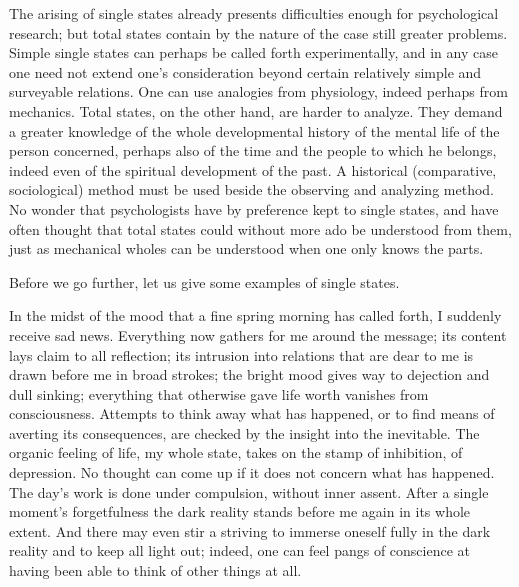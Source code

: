 \documentclass[12pt]{book}
\newcommand{\opage}[1]{\marginnote{\footnotesize\textit{[#1]}}}
\begin{document}
The arising of single states already presents difficulties enough for
psychological research; but total states contain by the nature of the case
still greater problems. Simple single states can perhaps be called forth
experimentally, and in any case one need not extend one's consideration beyond
certain relatively simple and surveyable relations. One can use analogies from
physiology, indeed perhaps from mechanics. Total states, on the other hand, are
harder to analyze. They demand a greater knowledge of the whole developmental
history of the mental life of the person concerned, perhaps also of the time
and the people to which he belongs, indeed even of the spiritual development of
the past. A historical (comparative, sociological) method must be used beside
the observing and analyzing method. No wonder that psychologists have by
preference kept to single states, and have often thought that total states could
without more ado be understood from them, just as mechanical wholes can be
understood when one only knows the parts.

Before we go further, let us give some examples of single states.

In the midst of the mood that a fine spring morning has called forth, I
suddenly receive sad news. Everything now gathers for me around the message;
its content lays claim to all reflection; its intrusion into relations that are
dear to me is drawn before me in broad strokes; the bright mood gives way to
dejection \opage{9}and dull sinking; everything that otherwise gave life worth
vanishes from consciousness. Attempts to think away what has happened, or to
find means of averting its consequences, are checked by the insight into the
inevitable. The organic feeling of life, my whole state, takes on the stamp of
inhibition, of depression. No thought can come up if it does not concern what
has happened. The day's work is done under compulsion, without inner assent.
After a single moment's forgetfulness the dark reality stands before me again
in its whole extent. And there may even stir a striving to immerse oneself
fully in the dark reality and to keep all light out; indeed, one can feel pangs
of conscience at having been able to think of other things at all.
\end{document}
